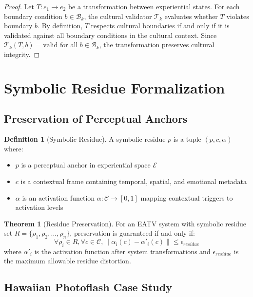 \documentclass[11pt]{article}
\theoremstyle{definition}
\newtheorem{definition}{Definition}
\newtheorem{theorem}{Theorem}
\begin{document}
\begin{proof}
Let $T: e_1 \rightarrow e_2$ be a transformation between experiential states. For each boundary condition $b \in \mathcal{B}_k$, the cultural validator $\mathcal{T}_k$ evaluates whether $T$ violates boundary $b$. By definition, $T$ respects cultural boundaries if and only if it is validated against all boundary conditions in the cultural context. Since $\mathcal{T}_k(T, b) = \text{valid}$ for all $b \in \mathcal{B}_k$, the transformation preserves cultural integrity.
\end{proof}

\section{Symbolic Residue Formalization}

\subsection{Preservation of Perceptual Anchors}

\begin{definition}[Symbolic Residue]
A symbolic residue $\rho$ is a tuple $(p, c, \alpha)$ where:
\begin{itemize}
    \item $p$ is a perceptual anchor in experiential space $\mathcal{E}$
    \item $c$ is a contextual frame containing temporal, spatial, and emotional metadata
    \item $\alpha$ is an activation function $\alpha: \mathcal{C} \rightarrow [0,1]$ mapping contextual triggers to activation levels
\end{itemize}
\end{definition}

\begin{theorem}[Residue Preservation]
For an EATV system with symbolic residue set $R = \{\rho_1, \rho_2, ..., \rho_n\}$, preservation is guaranteed if and only if:
\begin{equation}
\forall \rho_i \in R, \forall c \in \mathcal{C}, \| \alpha_i(c) - \alpha'_i(c) \| \leq \epsilon_{residue}
\end{equation}
where $\alpha'_i$ is the activation function after system transformations and $\epsilon_{residue}$ is the maximum allowable residue distortion.
\end{theorem}

\subsection{Hawaiian Photoflash Case Study}
\end{document}
